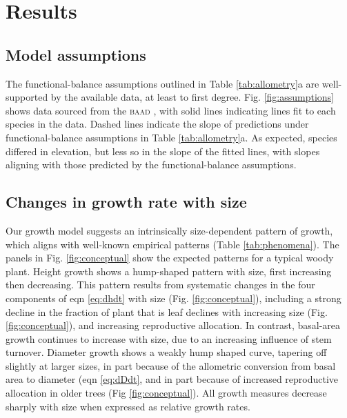 \documentclass[a4paper,11pt]{article}
\begin{document}
\section{Results}

\subsection{Model assumptions}

The functional-balance assumptions outlined in Table \ref{tab:allometry}a are well-supported by the available data, at least to first degree. Fig. \ref{fig:assumptions} shows data sourced from the \textsc{baad} \citep{Falster-2015b}, with solid lines indicating {\sma} lines fit to each species in the data. Dashed lines indicate the slope of predictions under functional-balance assumptions in Table \ref{tab:allometry}a. As expected, species differed in elevation, but less so in the slope of the fitted lines, with slopes aligning with those predicted by the functional-balance assumptions.

\subsection{Changes in growth rate with size}

Our growth model suggests an intrinsically size-dependent pattern of growth, which aligns with well-known empirical patterns (Table \ref{tab:phenomena}). The panels in Fig. \ref{fig:conceptual} show the expected patterns for a typical woody plant. Height growth shows a hump-shaped pattern with size, first increasing then decreasing. This pattern results from systematic changes in the four components of eqn \ref{eq:dhdt} with size (Fig. \ref{fig:conceptual}), including a strong decline in the fraction of plant that is leaf declines with increasing size (Fig. \ref{fig:conceptual}), and increasing reproductive allocation. In contrast, basal-area growth continues to increase with size, due to an increasing influence of stem turnover. Diameter growth shows a weakly hump shaped curve, tapering off slightly at larger sizes, in part because of the allometric conversion from basal area to diameter (eqn \ref{eq:dDdt}, and in part because of increased reproductive allocation in older trees (Fig \ref{fig:conceptual}). All growth measures decrease sharply with size when expressed as relative growth rates.

\end{document}
